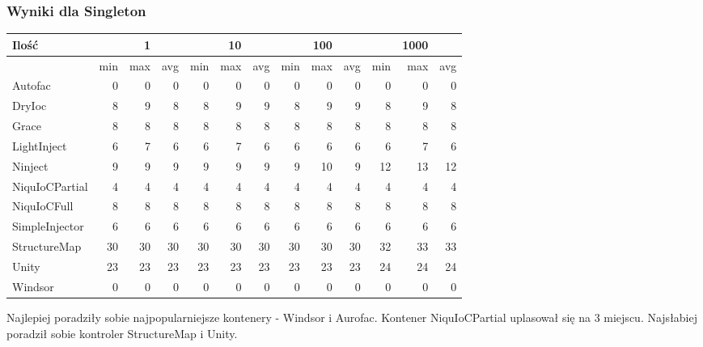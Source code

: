 \documentclass[12pt]{article}
\begin{document}
\subsubsection{Wyniki dla Singleton}
\begin{center}
\begin{small}
	\begin{tabular}{ | l | r r r | r r r | r r r | r r r | }
    		\hline
     		Ilość & & 1 & & & 10 & & & 100 & & & 1000 & \\ \hline
     		 & min & max & avg & min & max & avg & min & max & avg & min & max & avg \\ \hline
    		Autofac & 0 & 0 & 0 & 0 & 0 & 0 & 0 & 0 & 0 & 0 & 0 & 0 \\ \hline
   		DryIoc & 8 & 9 & 8 & 8 & 9 & 9 & 8 & 9 & 9 & 8 & 9 & 8 \\ \hline
		Grace & 8 & 8 & 8 & 8 & 8 & 8 & 8 & 8 & 8 & 8 & 8 & 8 \\ \hline
		LightInject & 6 & 7 & 6 & 6 & 7 & 6 & 6 & 6 & 6 & 6 & 7 & 6 \\ \hline
		Ninject & 9 & 9 & 9 & 9 & 9 & 9 & 9 & 10 & 9 & 12 & 13 & 12 \\ \hline
		NiquIoCPartial & 4 & 4 & 4 & 4 & 4 & 4 & 4 & 4 & 4 & 4 & 4 & 4 \\ \hline
		NiquIoCFull & 8 & 8 & 8 & 8 & 8 & 8 & 8 & 8 & 8 & 8 & 8 & 8 \\ \hline
		SimpleInjector & 6 & 6 & 6 & 6 & 6 & 6 & 6 & 6 & 6 & 6 & 6 & 6 \\ \hline
		StructureMap & 30 & 30 & 30 & 30 & 30 & 30 & 30 & 30 & 30 & 32 & 33 & 33 \\ \hline
		Unity & 23 & 23 & 23 & 23 & 23 & 23 & 23 & 23 & 23 & 24 & 24 & 24 \\ \hline
		Windsor & 0 & 0 & 0 & 0 & 0 & 0 & 0 & 0 & 0 & 0 & 0 & 0 \\
    		\hline
  	\end{tabular}
\end{small}
\end{center}
Najlepiej poradziły sobie najpopularniejsze kontenery - Windsor i Aurofac. Kontener NiquIoCPartial uplasował się na 3 miejscu. Najsłabiej poradził sobie kontroler StructureMap i Unity.
\end{document}
